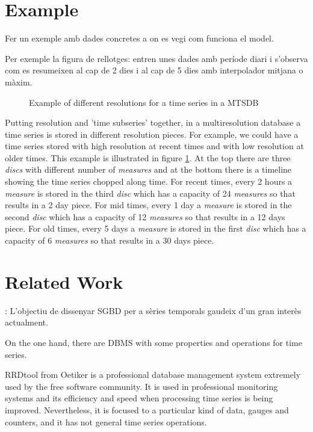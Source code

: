 \documentclass{scrartcl}
\newcommand{\imatges}{../../imatges}
\begin{document}








\section{Example}

Fer un exemple amb dades concretes a on es vegi com funciona el model.

Per exemple la figura de rellotges: entren unes dades amb període diari i s'observa com es resumeixen al cap de 2 dies i al cap de 5 dies amb interpolador mitjana o màxim.



\begin{figure}[tp]
\centering

\caption{Example of different resolutions for a time series in a MTSDB}
\label{fig:model:window}
\end{figure}


Putting resolution and 'time subseries' together, in a multiresolution database a time series is stored in different resolution pieces. For example, we could have a time series stored with high resolution at recent times and with low resolution at older times. This example is illustrated in figure \ref{fig:model:window}. At the top there are three \emph{discs} with different number of \emph{measures} and at the bottom there is a timeline showing the time series chopped along time. For recent times, every 2 hours a \emph{measure} is stored in the third \emph{disc} which has a capacity of 24 \emph{measures} so that results in a 2 day piece. For mid times, every 1 day a  \emph{measure} is stored in the second \emph{disc} which has a capacity of 12 \emph{measures} so that results in a 12 days piece. For old times, every 5 days a  \emph{measure} is stored in the first \emph{disc} which has a capacity of 6 \emph{measures} so that results in a 30 days piece. 


\section{Related Work}


: L'objectiu de dissenyar SGBD per a sèries temporals gaudeix d'un gran interès actualment.

On the one hand, there are DBMS with some properties and operations
for time series.

RRDtool from Oetiker \cite{rrdtool} is a professional database
management system extremely used by the free software community. It is
used in professional monitoring systems and its efficiency and speed
when processing time series is being improved. Nevertheless, it is
focused to a particular kind of data, gauges and counters, and it has
not general time series operations.
\end{document}

